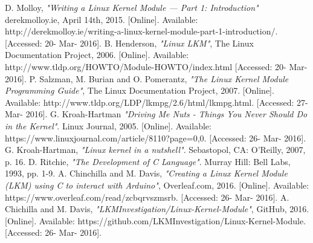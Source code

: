 \documentclass[12pt]{article}
\begin{document}
\newpage
\begin{thebibliography}{10}
  D.  Molloy,
  \emph{"Writing a Linux Kernel Module — Part 1: Introduction"}
  derekmolloy.ie, 
  April 14th, 2015. [Online]. 
  Available: http://derekmolloy.ie/writing-a-linux-kernel-module-part-1-introduction/. 
  [Accessed: 20- Mar- 2016].
  B. Henderson,
  \emph{"Linux LKM"},
  The Linux Documentation Project,
  2006. [Online]. 
  Available: http://www.tldp.org/HOWTO/Module-HOWTO/index.html 
  [Accessed: 20- Mar- 2016].
  P. Salzman, M. Burian and O. Pomerantz, 
  \emph{"The Linux Kernel Module Programming Guide"},
  The Linux Documentation Project, 2007. 
  [Online]. Available: http://www.tldp.org/LDP/lkmpg/2.6/html/lkmpg.html.
  [Accessed: 27- Mar- 2016].
  G.  Kroah-Hartman
  \emph{"Driving Me Nuts - Things You Never Should Do in the Kernel"}.
  Linux Journal,
  2005. [Online].
  Available: https://www.linuxjournal.com/article/8110?page=0,0.
  [Accessed: 26- Mar- 2016].  
  G. Kroah-Hartman,
  \emph{"Linux kernel in a nutshell"}.
  Sebastopol,
  CA: O'Reilly, 2007,
  p. 16.
  D. Ritchie, \emph{"The Development of C Language"}. 
  Murray Hill: Bell Labs, 1993,
  pp. 1-9.
	A. Chinchilla and M. Davis, 
    \emph{"Creating a Linux Kernel Module (LKM) using C to interact with Arduino"},
    Overleaf.com, 2016. [Online].
    Available: https://www.overleaf.com/read/zcbqrvszmsrb.
    [Accessed: 26- Mar- 2016].
  A. Chichilla and M. Davis,
  \emph{"LKMInvestigation/Linux-Kernel-Module"},
  GitHub, 2016. [Online].
  Available: https://github.com/LKMInvestigation/Linux-Kernel-Module.
  [Accessed: 26- Mar- 2016].
\end{thebibliography}
\end{document}

